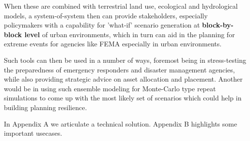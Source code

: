 When these are combined with terrestrial land use, ecological and
hydrological models, a system-of-system then can provide stakeholders,
especially policymakers with a capability for 'what-if' scenario
generation at \textbf{block-by-block level} of urban environments,
which in turn can aid in the planning for extreme events for agencies
like FEMA especially in urban environments. 

Such tools can then be used in a number of ways, foremost being in
stress-testing the preparedness of emergency responders and disaster
management agencies, while also providing strategic advice on asset
allocation and placement. Another would be in using such ensemble
modeling for Monte-Carlo type repeat simulations to come up with the
most likely set of scenarios which could help in building planning
resilience.

In Appendix A we articulate a technical solution. Appendix B
highlights some important usecases.